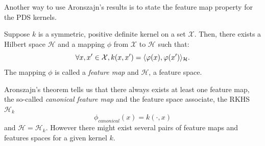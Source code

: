 Another way to use Aronszajn's results is to state the feature map property for
the PDS kernels.
\begin{proposition}
     Suppose $k$ is a symmetric, positive definite kernel on a set
     $\mathcal{X}$. Then, there exists a Hilbert space $\mathcal{H}$ and a
     mapping $\phi$ from $\mathcal{X}$ to $\mathcal{H}$ such that:
    \begin{dmath*}
        \forall x, x' \in \mathcal{X},
        k(x,x')=\inner{\phi(x),\phi(x')}_{\mathcal{H}}.
    \end{dmath*}
    The mapping $\phi$ is called a \emph{feature map} and $\mathcal{H}$, a
    feature space.
\end{proposition}
\begin{remark}
    Aronszajn's theorem tells us that there always exists at least one feature
    map, the so-called \emph{canonical feature map} and the feature space
    associate, the \acl{RKHS} $\mathcal{H}_k$ 
    \begin{dmath*}
        \phi_{canonical}(x)= k(\cdot, x)
    \end{dmath*}
    and $\mathcal{H}= \mathcal{H}_k$.  However there might exist several pairs
    of feature maps and features spaces for a given kernel $k$.
\end{remark}
